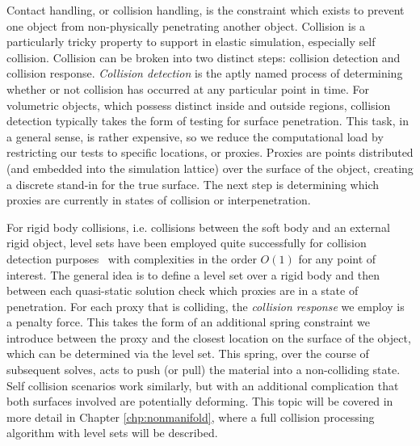   Contact handling, or collision handling, is the constraint which
  exists to prevent one object from non-physically penetrating another
  object. Collision is a particularly tricky property to support in
  elastic simulation, especially self collision. Collision can be
  broken into two distinct steps: collision detection and collision
  response. \textit{Collision detection} is the aptly named process of
  determining whether or not collision has occurred at any particular
  point in time. For volumetric objects, which possess distinct inside
  and outside regions, collision detection typically takes the form of
  testing for surface penetration. This task, in a general sense, is
  rather expensive, so we reduce the computational load by restricting
  our tests to specific locations, or proxies. Proxies are points
  distributed (and embedded into the simulation lattice) over the
  surface of the object, creating a discrete stand-in for the true
  surface. The next step is determining which proxies are currently in
  states of collision or interpenetration.

  For rigid body collisions, i.e. collisions between the soft body and
  an external rigid object, level sets have been employed quite
  successfully for collision detection
  purposes~\citep{TeranSIF:2005,McAdaZSETTS:2011} with complexities in
  the order $O(1)$ for any point of interest. The general idea is to
  define a level set over a rigid body and then between each
  quasi-static solution check which proxies are in a state of
  penetration. For each proxy that is colliding, the \textit{collision
    response} we employ is a penalty force. This takes the form of an
  additional spring constraint we introduce between the proxy and the
  closest location on the surface of the object, which can be
  determined via the level set. This spring, over the course of
  subsequent solves, acts to push (or pull) the material into a
  non-colliding state.  Self collision scenarios work similarly, but
  with an additional complication that both surfaces involved are
  potentially deforming. This topic will be covered in more detail in
  Chapter \ref{chp:nonmanifold}, where a full collision processing
  algorithm with level sets will be described.


